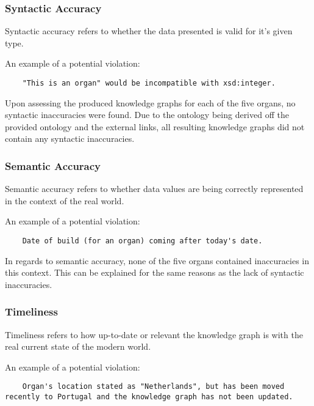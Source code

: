 \subsubsection{Syntactic Accuracy}
\hspace{0.5cm} Syntactic accuracy refers to whether the data presented is valid for it's given type. \cite{knowledgegraphevaulationbook}

\noindent An example of a potential violation: 
\begin{lstlisting}
    "This is an organ" would be incompatible with xsd:integer.
\end{lstlisting}

Upon assessing the produced knowledge graphs for each of the five organs, no syntactic inaccuracies were found. Due to the ontology being derived off the provided ontology and the external links, all resulting knowledge graphs did not contain any syntactic inaccuracies. 

\subsubsection{Semantic Accuracy}
\hspace{0.5cm} Semantic accuracy refers to whether data values are being correctly represented in the context of the real world. \cite{knowledgegraphevaulationbook}

\noindent An example of a potential violation: 
\begin{lstlisting}
    Date of build (for an organ) coming after today's date. 
\end{lstlisting}

In regards to semantic accuracy, none of the five organs contained inaccuracies in this context. This can be explained for the same reasons as the lack of syntactic inaccuracies. 

\subsubsection{Timeliness}
\hspace{0.5cm} Timeliness refers to how up-to-date or relevant the knowledge graph is with the real current state of the modern world. \cite{knowledgegraphevaulationbook}

\noindent An example of a potential violation: 
\begin{lstlisting}
    Organ's location stated as "Netherlands", but has been moved recently to Portugal and the knowledge graph has not been updated.
\end{lstlisting}

